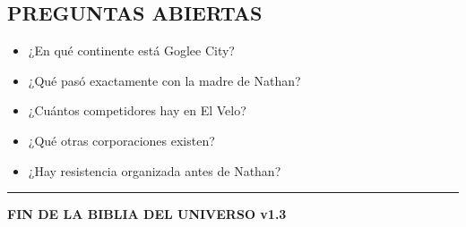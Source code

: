 \documentclass[11pt,a4paper]{report}
\begin{document}
\subsection{PREGUNTAS ABIERTAS}

\begin{itemize}
  \item ¿En qué continente está Goglee City?
  \item ¿Qué pasó exactamente con la madre de Nathan?
  \item ¿Cuántos competidores hay en El Velo?
  \item ¿Qué otras corporaciones existen?
  \item ¿Hay resistencia organizada antes de Nathan?

\end{itemize}
\bigskip\hrule\bigskip

\textbf{FIN DE LA BIBLIA DEL UNIVERSO v1.3}
\end{document}
